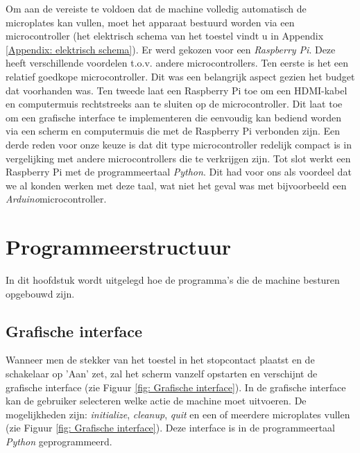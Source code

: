 \documentclass[a4paper,twoside,kulak]{kulakreport} %
\begin{document}
Om aan de vereiste te voldoen dat de machine volledig automatisch de microplates kan vullen, moet het apparaat bestuurd worden via een microcontroller (het elektrisch schema van het toestel vindt u in Appendix \ref{Appendix: elektrisch schema}). Er werd gekozen voor een \textit{Raspberry Pi}. Deze heeft verschillende voordelen t.o.v. andere microcontrollers. Ten eerste is het een relatief goedkope microcontroller. Dit was een belangrijk aspect gezien het budget dat voorhanden was. Ten tweede laat een Raspberry Pi toe om een HDMI-kabel en computermuis rechtstreeks aan te sluiten op de microcontroller. Dit laat toe om een grafische interface te implementeren die eenvoudig kan bediend worden via een scherm en computermuis die met de Raspberry Pi verbonden zijn. Een derde reden voor onze keuze is dat dit type microcontroller redelijk compact is in vergelijking met andere microcontrollers die te verkrijgen zijn. Tot slot werkt een Raspberry Pi met de programmeertaal \textit{Python}. Dit had voor ons als voordeel dat we al konden werken met deze taal, wat niet het geval was met bijvoorbeeld een \textit{Arduino}microcontroller. 



\chapter{Programmeerstructuur}

In dit hoofdstuk wordt uitgelegd hoe de programma's die de machine besturen opgebouwd zijn.

\section{Grafische interface}
Wanneer men de stekker van het toestel in het stopcontact plaatst en de schakelaar op 'Aan' zet, zal het scherm vanzelf opstarten en verschijnt de grafische interface (zie Figuur \ref{fig: Grafische interface}). In de grafische interface kan de gebruiker selecteren welke actie de machine moet uitvoeren. De mogelijkheden zijn: \textit{initialize}, \textit{cleanup}, \textit{quit} en een of meerdere microplates vullen (zie Figuur \ref{fig: Grafische interface}). Deze interface is in de programmeertaal \textit{Python} geprogrammeerd. 
\end{document}
